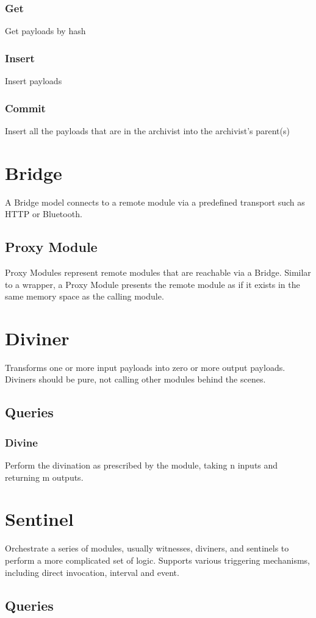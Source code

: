 \documentclass{article}
\begin{document}
\subsubsection{Get}
Get payloads by hash
\subsubsection{Insert}
Insert payloads
\subsubsection{Commit}
Insert all the payloads that are in the archivist into the archivist's parent(s)
\section{Bridge}
A Bridge model connects to a remote module via a predefined transport such as HTTP or Bluetooth.
\subsection{Proxy Module}
Proxy Modules represent remote modules that are reachable via a Bridge.  Similar to a wrapper, a Proxy Module presents the remote module as if it exists in the same memory space as the calling module.
\section{Diviner}
Transforms one or more input payloads into zero or more output payloads.  Diviners should be pure, not calling other modules behind the scenes.
\subsection{Queries}
\subsubsection{Divine}
Perform the divination as prescribed by the module, taking n inputs and returning m outputs.

\section{Sentinel}
Orchestrate a series of modules, usually witnesses, diviners, and sentinels to perform a more complicated set of logic.  Supports various triggering mechanisms, including direct invocation, interval and event.
\subsection{Queries}
\end{document}
